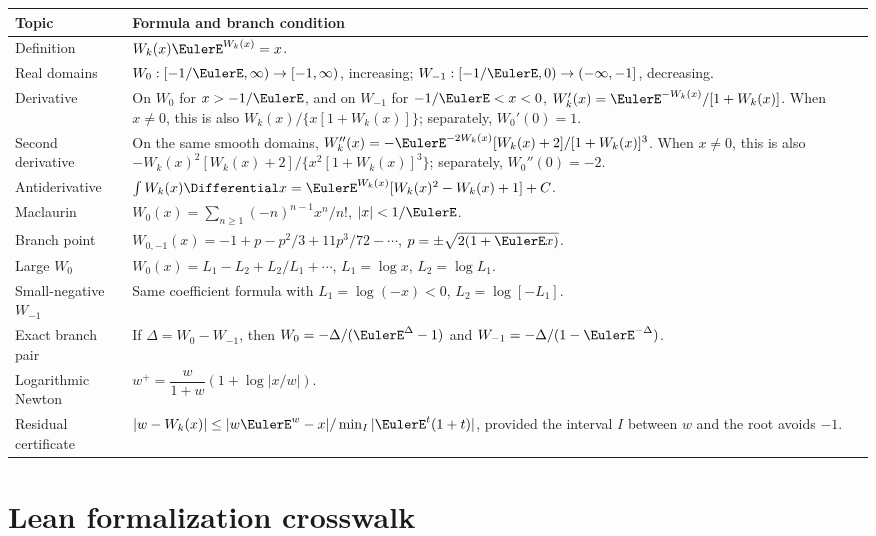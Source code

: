 \documentclass[11pt]{article}
\theoremstyle{remark}
\begin{document}
\begin{longtable}{@{}p{}p{}@{}}
\toprule
Topic & Formula and branch condition\\
\midrule
\endhead
Definition & \(W_k(x)\EulerE^{W_k(x)}=x\).\\
\addlinespace
Real domains & \(W_0:[-1/\EulerE,\infty)\to[-1,\infty)\), increasing;
\(W_{-1}:[-1/\EulerE,0)\to(-\infty,-1]\), decreasing.\\
\addlinespace
Derivative & On \(W_0\) for \(x>-1/\EulerE\), and on \(W_{-1}\) for
\(-1/\EulerE<x<0\),
\(W_k'(x)=\EulerE^{-W_k(x)}/[1+W_k(x)]\).  When \(x\neq0\), this is also
\(W_k(x)/\{x[1+W_k(x)]\}\); separately, \(W_0'(0)=1\).\\
\addlinespace
Second derivative & On the same smooth domains,
\(W_k''(x)=-\EulerE^{-2W_k(x)}[W_k(x)+2]/[1+W_k(x)]^3\).  When
\(x\neq0\), this is also
\(-W_k(x)^2[W_k(x)+2]/\{x^2[1+W_k(x)]^3\}\); separately,
\(W_0''(0)=-2\).\\
\addlinespace
Antiderivative &
\(\int W_k(x)\Differential x=\EulerE^{W_k(x)}[W_k(x)^2-W_k(x)+1]+C\).\\
\addlinespace
Maclaurin &
\(W_0(x)=\sum_{n\geq1}(-n)^{n-1}x^n/n!\), \(|x|<1/\EulerE\).\\
\addlinespace
Branch point &
\(W_{0,-1}(x)=-1+p-p^2/3+11p^3/72-\cdots\),
\(p=\pm\sqrt{2(1+\EulerE x)}\).\\
\addlinespace
Large \(W_0\) &
\(W_0(x)=L_1-L_2+L_2/L_1+\cdots\),
\(L_1=\log x\), \(L_2=\log L_1\).\\
\addlinespace
Small-negative \(W_{-1}\) & Same coefficient formula with
\(L_1=\log(-x)<0\), \(L_2=\log[-L_1]\).\\
\addlinespace
Exact branch pair &
If \(\Delta=W_0-W_{-1}\), then
\(W_0=-\Delta/(\EulerE^\Delta-1)\) and
\(W_{-1}=-\Delta/(1-\EulerE^{-\Delta})\).\\
\addlinespace
Logarithmic Newton &
\(w^+=\dfrac{w}{1+w}\left(1+\log\left|x/w\right|\right)\).\\
\addlinespace
Residual certificate &
\(|w-W_k(x)|\leq|w\EulerE^w-x|/\min_I|\EulerE^t(1+t)|\), provided the interval
\(I\) between \(w\) and the root avoids \(-1\).\\
\bottomrule
\end{longtable}

\section{Lean formalization crosswalk}\label{app:lean-crosswalk}
\end{document}
